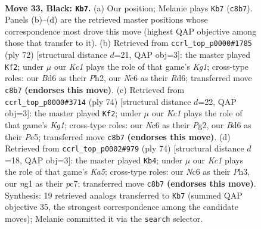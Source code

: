 \documentclass[11pt]{article}
\begin{document}
\clearpage

\begin{figure}[p]\centering
\begin{subfigure}{0.46\textwidth}\centering
\resizebox{\linewidth}{!}{%
\newchessgame
\chessboard[
  setfen={2k5/8/2nb2p1/6P1/p7/3bB3/8/4K1N1 b - - 1 33},
  showmover=false,
  pgfstyle=straightmove, color=movearrow, markmove={c8-b7}
]}
\caption{}
\end{subfigure}\hfill
\begin{subfigure}{0.46\textwidth}\centering
\resizebox{\linewidth}{!}{%
\newchessgame
\chessboard[
  setfen={r7/7k/3R4/5p2/4b3/2B3P1/7P/6K1 w - - 1 37},
  showmover=false,
  pgfstyle=straightmove, color=movearrow, markmove={g1-f2}
]}
\caption{}
\end{subfigure}
\\[4pt]
\begin{subfigure}{0.46\textwidth}\centering
\resizebox{\linewidth}{!}{%
\newchessgame
\chessboard[
  setfen={8/4Np1k/p7/4P1p1/1Pb5/8/6P1/6K1 w - - 0 38},
  showmover=false,
  pgfstyle=straightmove, color=movearrow, markmove={g1-f2}
]}
\caption{}
\end{subfigure}\hfill
\begin{subfigure}{0.46\textwidth}\centering
\resizebox{\linewidth}{!}{%
\newchessgame
\chessboard[
  setfen={8/2p5/6p1/K2k2P1/8/3b3P/5B2/8 w - - 1 38},
  showmover=false,
  pgfstyle=straightmove, color=movearrow, markmove={a5-b4}
]}
\caption{}
\end{subfigure}
\caption{\textbf{Move 33, Black: \texttt{Kb7}.} (a) Our position; Melanie plays \texttt{Kb7} (\texttt{c8b7}). Panels (b)--(d) are the retrieved master positions whose correspondence most drove this move (highest QAP objective among those that transfer to it). (b) Retrieved from \texttt{ccrl\_top\_p0000\#1785} (ply 72) [structural distance $d$=21, QAP obj=3]: the master played \texttt{Kf2}; under $\mu$ our \emph{Kc1} plays the role of that game's \emph{Kg1}; cross-type roles: our \emph{B}d6 as their \emph{P}h2, our \emph{N}c6 as their \emph{R}d6; transferred move \texttt{c8b7} \textbf{(endorses this move)}. (c) Retrieved from \texttt{ccrl\_top\_p0000\#3714} (ply 74) [structural distance $d$=22, QAP obj=3]: the master played \texttt{Kf2}; under $\mu$ our \emph{Kc1} plays the role of that game's \emph{Kg1}; cross-type roles: our \emph{N}c6 as their \emph{P}g2, our \emph{B}d6 as their \emph{P}e5; transferred move \texttt{c8b7} \textbf{(endorses this move)}. (d) Retrieved from \texttt{ccrl\_top\_p0002\#979} (ply 74) [structural distance $d$=18, QAP obj=3]: the master played \texttt{Kb4}; under $\mu$ our \emph{Kc1} plays the role of that game's \emph{Ka5}; cross-type roles: our \emph{N}c6 as their \emph{P}h3, our \emph{n}g1 as their \emph{p}c7; transferred move \texttt{c8b7} \textbf{(endorses this move)}. Synthesis: 19 retrieved analogs transferred to \texttt{Kb7} (summed QAP objective 35, the strongest correspondence among the candidate moves); Melanie committed it via the \texttt{search} selector.}
\label{fig:thought-m65}
\end{figure}
\end{document}

